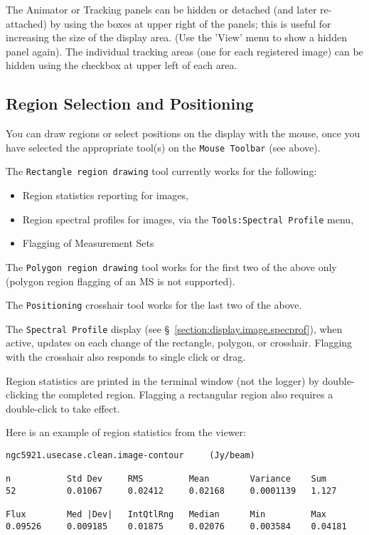 The Animator or Tracking panels can be hidden or detached (and later
re-attached) by using the boxes at upper right of the panels; this is
useful for increasing the size of the display area.  (Use the 'View'
menu to show a hidden panel again).  The individual tracking areas
(one for each registered image) can be hidden using the checkbox at
upper left of each area.


\subsection{Region Selection and Positioning}
\label{section:display.viewerGUI.displaypanel.region}

You can draw regions or select positions on the display with the mouse,
once you have selected the appropriate tool(s) on the {\tt Mouse Toolbar}
(see above).

The {\tt Rectangle region drawing} tool currently works for the following: 
\begin{itemize}
  \item Region statistics reporting for images,
  \item Region spectral profiles for images, via the
        {\tt Tools:Spectral Profile} menu,
  \item Flagging of Measurement Sets
\end{itemize}

The {\tt Polygon region drawing} tool works for the first two of the
above only (polygon region flagging of an MS is not supported).

The {\tt Positioning} crosshair tool works for the last two of the above.

The {\tt Spectral Profile} display
(see \S~\ref{section:display.image.specprof}), when active, updates on
each change of the rectangle, polygon, or crosshair.  
Flagging with the crosshair also responds to single click or drag.

Region statistics are printed in the terminal window (not the logger)
by double-clicking the completed region.  Flagging a rectangular region
also requires a double-click to take effect.

Here is an example of region statistics from the viewer:
\small
\begin{verbatim}
ngc5921.usecase.clean.image-contour     (Jy/beam)

n           Std Dev     RMS         Mean        Variance    Sum
52          0.01067     0.02412     0.02168     0.0001139   1.127     

Flux        Med |Dev|   IntQtlRng   Median      Min         Max
0.09526     0.009185    0.01875     0.02076     0.003584    0.04181   
\end{verbatim}
\normalsize

